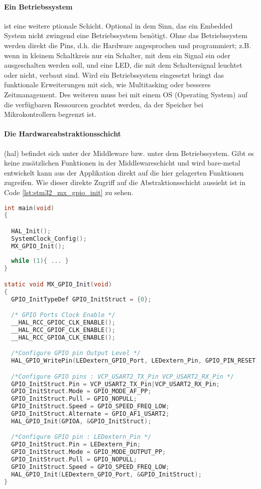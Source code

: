 \paragraph{Ein Betriebssystem} ist eine weitere ptionale Schicht.
Optional in dem Sinn, das ein Embedded System nicht zwingend eine Betriebssystem benötigt.
Ohne das Betriebssystem werden direkt die Pins, d.h. die Hardware angesprochen und programmiert; z.B. wenn in kleinem Schaltkreis nur ein Schalter, mit dem ein Signal ein oder ausgeschalten werden soll, und eine LED, die mit dem Schaltersignal leuchtet oder nicht, verbaut sind.
Wird ein Betriebssystem eingesetzt bringt das funktionale Erweiterungen mit sich, wie Multitasking oder besseres Zeitmanagement.
Des weiteren muss bei mit einem OS (Operating System) auf die verfügbaren Ressourcen geachtet werden, da der Speicher bei Mikrokontrollern begrenzt ist.

\paragraph{Die Hardwareabstraktionsschicht} (\gls{hal}) befindet sich unter der Middleware bzw. unter dem Betriebssystem.
Gibt es keine zusätzlichen Funktionen in der Middlewareschicht und wird bare-metal entwickelt kann aus der Applikation direkt auf die hier gelagerten Funktionen zugreifen.
Wie dieser direkte Zugriff auf die Abstraktionsschicht aussieht ist in Code \ref{lst:stm32_mx_gpio_init} %
zu sehen.

\begin{lstlisting}[language=C, caption={Funktion zur Initialisierung der GPIO-Pins aus einem STM32-Projekt.}, label={lst:stm32_mx_gpio_init}]
int main(void)
{

  HAL_Init();
  SystemClock_Config();
  MX_GPIO_Init();
  
  while (1){ ... } 
}

static void MX_GPIO_Init(void)
{
  GPIO_InitTypeDef GPIO_InitStruct = {0};

  /* GPIO Ports Clock Enable */
  __HAL_RCC_GPIOC_CLK_ENABLE();
  __HAL_RCC_GPIOF_CLK_ENABLE();
  __HAL_RCC_GPIOA_CLK_ENABLE();

  /*Configure GPIO pin Output Level */
  HAL_GPIO_WritePin(LEDextern_GPIO_Port, LEDextern_Pin, GPIO_PIN_RESET);

  /*Configure GPIO pins : VCP_USART2_TX_Pin VCP_USART2_RX_Pin */
  GPIO_InitStruct.Pin = VCP_USART2_TX_Pin|VCP_USART2_RX_Pin;
  GPIO_InitStruct.Mode = GPIO_MODE_AF_PP;
  GPIO_InitStruct.Pull = GPIO_NOPULL;
  GPIO_InitStruct.Speed = GPIO_SPEED_FREQ_LOW;
  GPIO_InitStruct.Alternate = GPIO_AF1_USART2;
  HAL_GPIO_Init(GPIOA, &GPIO_InitStruct);

  /*Configure GPIO pin : LEDextern_Pin */
  GPIO_InitStruct.Pin = LEDextern_Pin;
  GPIO_InitStruct.Mode = GPIO_MODE_OUTPUT_PP;
  GPIO_InitStruct.Pull = GPIO_NOPULL;
  GPIO_InitStruct.Speed = GPIO_SPEED_FREQ_LOW;
  HAL_GPIO_Init(LEDextern_GPIO_Port, &GPIO_InitStruct);
}
\end{lstlisting}

